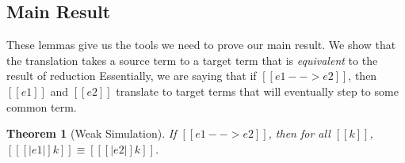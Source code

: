 \documentclass[11pt]{article}
\newtheorem{theorem}{Theorem}[section]
\begin{document}
\subsection{Main Result}

These lemmas give us the tools we need to prove our main result.
We show that the translation takes a source term to a target term
that is \textit{equivalent} to the result of reduction 
Essentially, we are saying that if $[[e1 --> e2]]$, then $[[e1]]$ and $[[e2]]$
translate to target terms that will eventually step to some common term.

\begin{theorem}[Weak Simulation]

	If $[[e1 --> e2]]$, then for all $[[k]]$, $[[ [|e1|]k]] \equiv  [[ [|e2|]k  ]]$.

\end{theorem}
\end{document}
